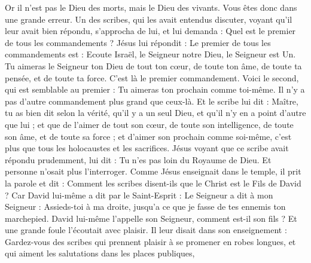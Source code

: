 \begin{multicols}{2}
Or il n'est pas le Dieu des morts, mais le Dieu des vivants. Vous êtes donc dans une grande erreur.
Un des scribes, qui les avait entendus discuter, voyant qu'il leur avait bien répondu, s'approcha de lui, et lui demanda : Quel est le premier de tous les commandements ?
Jésus lui répondit : Le premier de tous les commandements est : Ecoute Israël{}, le Seigneur notre Dieu, le Seigneur est Un{}.
Tu aimeras le Seigneur ton Dieu de tout ton cœur, de toute ton âme, de toute ta pensée, et de toute ta force. C'est là le premier commandement.
Voici le second, qui est semblable au premier : Tu aimeras ton prochain comme toi-même. Il n'y a pas d'autre commandement plus grand que ceux-là.
Et le scribe lui dit : Maître, tu as bien dit selon la vérité, qu'il y a un seul Dieu, et qu'il n'y en a point d'autre que lui ;
et que de l'aimer de tout son cœur, de toute son intelligence, de toute son âme, et de toute sa force ; et d'aimer son prochain comme soi-même, c'est plus que tous les holocaustes et les sacrifices.
Jésus voyant que ce scribe avait répondu prudemment, lui dit : Tu n'es pas loin du Royaume de Dieu. Et personne n'osait plus l'interroger.
Comme Jésus enseignait dans le temple, il prit la parole et dit : Comment les scribes disent-ils que le Christ est le Fils de David ?
Car David lui-même a dit par le Saint-Esprit : Le Seigneur a dit à mon Seigneur : Assieds-toi à ma droite, jusqu'a ce que je fasse de tes ennemis ton marchepied{}.
David lui-même l'appelle son Seigneur, comment est-il son fils ? Et une grande foule l’écoutait avec plaisir.
Il leur disait dans son enseignement : Gardez-vous des scribes qui prennent plaisir à se promener en robes longues, et qui aiment les salutations dans les places publiques,

\end{multicols}
